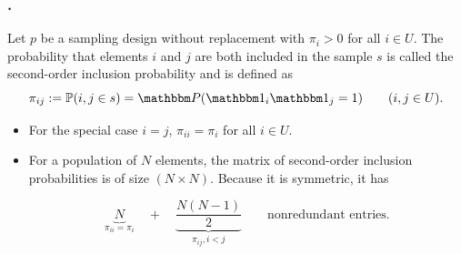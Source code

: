 \documentclass{my_eth_beamer}
\numberwithin{equation}{section}
\begin{document}
\begin{frame}
    \frametitle{\insertsectionnumber.\insertsubsectionnumber~\insertsubsection}
    \begin{Def}
        \label{def:inclusionprobabilities_2}
        \vspace{-0.5em}
        Let $p$ be a sampling design without replacement with $\pi_i>0$ for all
        $i\in U$. The probability that elements $i$ and $j$ are both included
        in the sample $s$ is called the \alert{second-order inclusion
        probability} and is defined as
        \begin{equation*}
            \pi_{ij} := \mathbb{P}(i,j \in s) =
                \PP(\indicator_i \indicator_j = 1) \qquad (i,j \in U).
        \end{equation*}
    \end{Def}
    \vspace{0.25em}
    \begin{itemize}
    \setlength{\itemsep}{4pt}
        \item For the \alert{special case} $i=j$, $\pi_{ii}=\pi_i$ for all
            $i\in U$.
        \item For a population of $N$ elements, the matrix of second-order
            inclusion probabilities is of size $(N\times N)$. Because it is
            \alert{symmetric}, it has

            \vspace{-0.7em}

            \begin{equation*}
                \underbrace{N}_{\pi_{ii} = \pi_i} \quad + \quad
                    \underbrace{\frac{N(N - 1)}{2}}_{\pi_{ij}, i < j}
                    \qquad \text{nonredundant entries}.
            \end{equation*}
    \end{itemize}
\end{frame}
\end{document}
